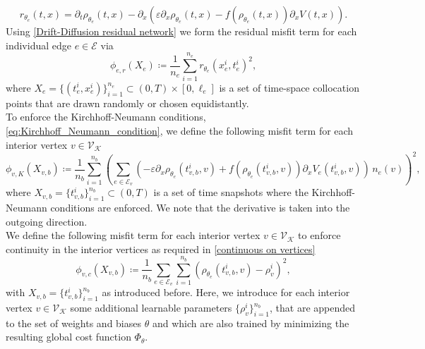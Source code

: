 \begin{equation}
    \label{Drift-Diffusion residual network}
    r_{\theta_e} \left( t,x \right)=\partial_t \rho_{\theta_e} \left( t,x \right) - \partial_x   \left(  \varepsilon \partial_x  \rho_{\theta_e} \left( t,x \right) - f \left( \rho_{\theta_e} \left( t,x \right) \right) \partial_x V \left( t,x \right) \right).
\end{equation}
Using \cref{Drift-Diffusion residual network} we form the residual misfit term for each individual edge $e \in \mathcal{E}$ via
\begin{equation} 
    \label{misfit:residual}
    \phi_{e,r}  \left( X_e \right) \coloneqq \frac{1}{n_e} \sum_{i=1}^{n_e} r_{\theta_e}  \left( x_e^i, t_e^i \right)^2,
\end{equation} 
where $X_e = \{ \left( t_e^i, x_e^i \right)\}_{i=1}^{n_e} \subset \left( 0, T \right) \times [0, \ell_e]$ is a set of time-space collocation points that are drawn randomly or chosen equidistantly. \\
To enforce the Kirchhoff-Neumann conditions, \cref{eq:Kirchhoff_Neumann_condition}, we define the following misfit term for each interior vertex $v \in \mathcal{V}_\mathcal{K}$ 
\begin{equation} 
    \label{misfit:Kirchhoff}
    \phi_{v,K}  \left( X_{v,b} \right) \coloneqq \frac{1}{n_b} \sum_{i=1}^{n_b}  \left( \sum_{e \in \mathcal{E}_v}  \left( - \varepsilon \partial_x \rho_{\theta_e}  \left( t_{v,b}^i, v \right) + f \left( \rho_{\theta_e}  \left( t_{v,b}^i, v \right) \right) \partial_x V_e \left( t_{v,b}^i, v \right) \right) \, n_e  \left( v \right) \right)^2, 
\end{equation} 
where $X_{v,b} = \{t_{v,b}^i\}_{i=1}^{n_b} \subset  \left( 0,T \right)$ is a set of time snapshots where the Kirchhoff-Neumann conditions are enforced. We note that the derivative is taken into the outgoing direction. \\
We define the following misfit term for each interior vertex $v \in \mathcal{V}_\mathcal{K}$ to enforce continuity in the interior vertices as required in \cref{continuous on vertices}
\begin{equation} 
    \label{misfit:continuity}
    \phi_{v,c}  \left( X_{v,b} \right) \coloneqq \frac{1}{n_b} \sum_{e \in \mathcal{E}_v} \sum_{i=1}^{n_b} \left(  \rho_{\theta_e}  \left( t_{v,b}^i, v \right) - \rho_{v}^i \right)^2,
\end{equation} 
with $X_{v,b} = \{t_{v,b}^i\}_{i=1}^{n_b}$ as introduced before. Here, we introduce for each interior vertex $v \in \mathcal{V}_\mathcal{K}$ some additional learnable parameters $\{\rho_{v}^i\}_{i=1}^{n_b}$, that are appended to the set of weights and biases $\theta$ and which are also trained by minimizing the resulting global cost function $\Phi_\theta$. \\
